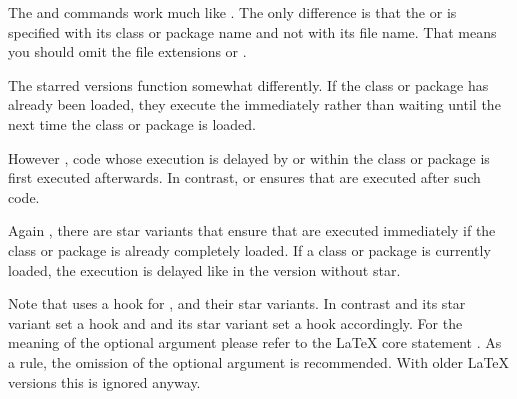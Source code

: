 \begin{Declaration}
\end{Declaration}%
The  and  commands work much like
. The only difference is that the
 or  is specified with its class or package name
and not with its file name. That means you should omit the file extensions
 or .

The starred versions
function somewhat differently. If the class or package has already been
loaded, they execute the  immediately rather than waiting
until the next time the class or package is loaded.

However%
, code
whose execution is delayed by  or 
within the class or package is first executed afterwards. In contrast,
 or  ensures that
 are executed after such code.

Again%
, there
are star variants that ensure that  are executed immediately
if the class or package is already completely loaded. If a class or package is
currently loaded, the execution is delayed like in the version without star.

Note that  uses a  hook for
,  and their star variants. In contrast
 and its star variant set a  hook
and  and its star variant set a
 hook accordingly. For the meaning of the optional
argument  please refer to the \LaTeX{} core statement
. As a rule, the omission of the optional
argument is recommended. With older \LaTeX{} versions this is ignored anyway.

